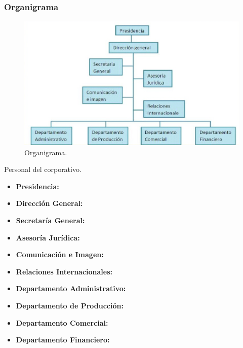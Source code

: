 \documentclass[12pt,letterpaper]{article}
\begin{document}
\newpage
\subsubsection{Organigrama}
\begin{figure}[ht]
    \centering
    \includegraphics[width=.9\textwidth]{imagenes/organigrama.png}
    \caption{Organigrama. \cite{costenaorganigrama}}
\end{figure}
Personal del corporativo.
\begin{itemize}
    \item \textbf{Presidencia: }
    \item \textbf{Dirección General: }
    \item \textbf{Secretaría General: }
    \item \textbf{Asesoría Jurídica: }
    \item \textbf{Comunicación e Imagen: }
    \item \textbf{Relaciones Internacionales: }
    \item \textbf{Departamento Administrativo: }
    \item \textbf{Departamento de Producción: }
    \item \textbf{Departamento Comercial: }
    \item \textbf{Departamento Financiero: }
\end{itemize}

\newpage
\end{document}
